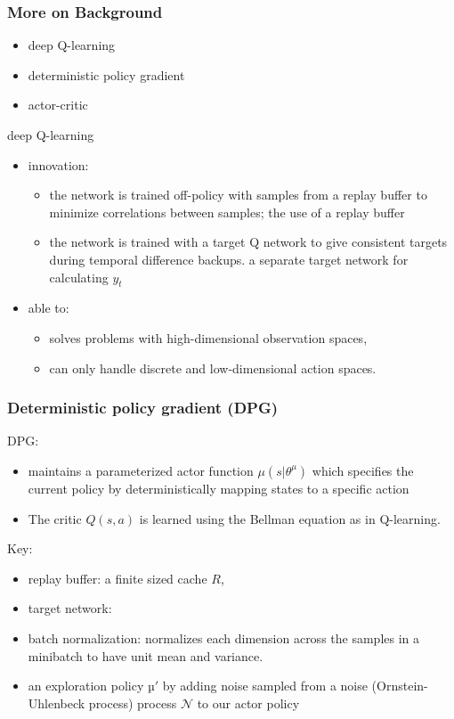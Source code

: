 \begin{frame}
\frametitle{More on Background}

\begin{itemize}
  \item deep Q-learning \cite{Mnih2013}
  \item deterministic policy gradient \cite{Silver2014}
  \item actor-critic
\end{itemize}

deep Q-learning \cite{Mnih2013}
\begin{itemize}
  \item innovation:
  \begin{itemize}
    \item the network is trained off-policy with samples from a replay buffer to minimize correlations between samples;
    the use of a replay buffer
    \item the network is trained with a target Q network to give consistent targets during temporal difference backups.
    a separate target network for calculating $y_t$
  \end{itemize}
  \item able to:
  \begin{itemize}
    \item solves problems with high-dimensional observation spaces,
    \item can only handle discrete and low-dimensional action spaces.
  \end{itemize}
\end{itemize}

\end{frame}

\begin{frame}
\frametitle{Deterministic policy gradient (DPG) \cite{Silver2014}}

DPG:
\begin{itemize}
  \item maintains a parameterized actor function $\mu (s|\theta^{\mu})$ which
  specifies the current policy by deterministically mapping states to a specific action
  \item The critic $Q(s, a)$ is learned using the Bellman equation as in Q-learning.
\end{itemize}

Key:
\begin{itemize}
  \item replay buffer: a finite sized cache $R$,
  \item target network:
  \item batch normalization: normalizes each dimension across the samples
  in a minibatch to have unit mean and variance.
  \item an exploration policy $µ'$ by adding noise sampled from
  a noise (Ornstein-Uhlenbeck process) process $\mathcal{N}$ to our actor policy
\end{itemize}

\end{frame}


